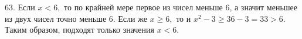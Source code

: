 63. Если $x<6,$ то по крайней мере первое из чисел меньше 6, а значит меньшее из двух чисел точно меньше 6. Если же $x\geqslant6,$ то и $x^2-3\geqslant36-3=33>6.$ Таким образом, подходят только значения $x<6.$\\
